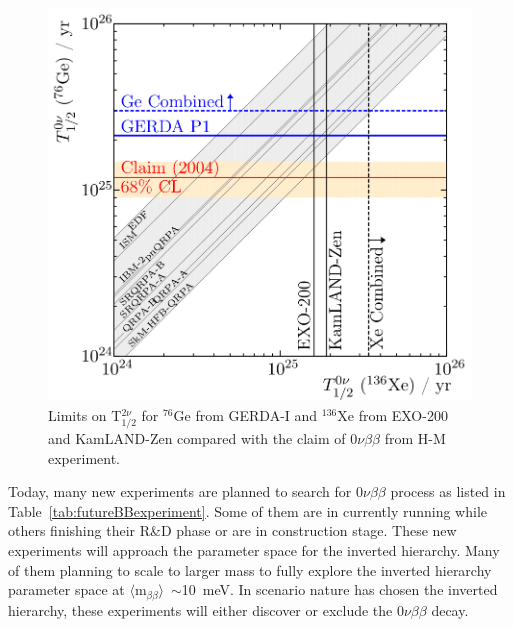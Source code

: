 \documentclass[main.tex]{subfiles}
\begin{document}
\begin{figure}[h!]
\begin{center}
\includegraphics[scale=0.30]{pictures/Chap2/Gerda-EXO-combined.png}
\caption{Limits on T$_{\text{1/2}}^{\text{2}\nu}$ for $^{\text{76}}$Ge from GERDA-I and $^{\text{136}}$Xe from EXO-200 and KamLAND-Zen compared with the claim of 0$\nu\beta\beta$ from H-M experiment.}
\label{Gerda-EXO-combined}
\end{center}
\end{figure}


\FloatBarrier


\NI Today, many new experiments are planned to search for 0$\nu\beta\beta$ process as listed in Table~\ref{tab:futureBBexperiment}. Some of them are in currently running while others finishing their R\&D phase or are in construction stage. These new experiments will approach the parameter space for the inverted hierarchy. Many of them planning to scale to larger mass to fully explore the inverted hierarchy parameter space at $ \langle \text{m}_{\beta\beta} \rangle$~$\sim$10~meV. In scenario nature has chosen the inverted hierarchy, these experiments will either discover or exclude the 0$\nu\beta\beta$ decay.
\end{document}
